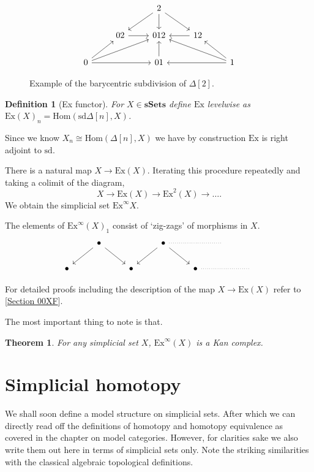 \documentclass[12pt]{report}
\numberwithin{equation}{section}
\newcommand{\Hom}{{\mathrm{Hom}}}
\newtheorem{theorem}[dummy]{Theorem}
\newtheorem{definition}[dummy]{Definition}
\begin{document}
	\begin{figure}[!htb]
		\centering
		\[\begin{tikzcd}
			&& 2 \\
			& 02 & 012 & 12 \\
			0 && 01 && 1
			\arrow[from=1-3, to=2-2]
			\arrow[from=1-3, to=2-3]
			\arrow[from=1-3, to=2-4]
			\arrow[from=2-2, to=2-3]
			\arrow[from=2-4, to=2-3]
			\arrow[from=3-1, to=2-2]
			\arrow[from=3-1, to=2-3]
			\arrow[from=3-1, to=3-3]
			\arrow[from=3-3, to=2-3]
			\arrow[from=3-5, to=2-3]
			\arrow[from=3-5, to=2-4]
			\arrow[from=3-5, to=3-3]
		\end{tikzcd}\]
		\caption{Example of the barycentric subdivision of \(\Delta[2]\).}
		\label{fig:bary}
	\end{figure}
	\begin{definition}[Ex functor]
		For \( X \in \mathbf{sSets} \) define \( \mathrm{Ex} \) levelwise as \( \mathrm{Ex}(X)_n = \Hom(\mathrm{sd}\Delta[n],X) \).
	\end{definition}
	
	Since we know \( X_n \cong \Hom(\Delta[n],X) \) we have by construction \( \mathrm{Ex} \) is right adjoint to \( \mathrm{sd} \).
	
	There is a natural map \( X \to \mathrm{Ex}(X) \). Iterating this procedure repeatedly and taking a colimit of the diagram,\[ X \to \mathrm{Ex}(X) \to \mathrm{Ex}^2(X) \to \dots. \]
	We obtain the simplicial set \( \mathrm{Ex}^\infty X \).
	
	The elements of \( \mathrm{Ex}^\infty(X)_1 \) consist of `zig-zags' of morphisms in \( X \).
	\[\begin{tikzcd}
		& \bullet && \bullet && {} \\
		\bullet && \bullet && \bullet && {}
		\arrow[from=1-2, to=2-1]
		\arrow[from=1-2, to=2-3]
		\arrow[dotted, no head, from=1-4, to=1-6]
		\arrow[from=1-4, to=2-3]
		\arrow[from=1-4, to=2-5]
		\arrow[dotted, no head, from=2-5, to=2-7]
	\end{tikzcd}\]
	
	For detailed proofs including the description of the map \( X \to \mathrm{Ex}(X) \) refer to \cite{kerodon}[\href{https://kerodon.net/tag/00XF}{Section 00XF}].
	
	The most important thing to note is that.
	\begin{theorem}
		For any simplicial set \( X \), \( \mathrm{Ex}^\infty(X) \) is a Kan complex.
	\end{theorem}
	\section{Simplicial homotopy}
	We shall soon define a model structure on simplicial sets. After which we can directly read off the definitions of homotopy and homotopy equivalence as covered in the chapter on model categories. However, for clarities sake we also write them out here in terms of simplicial sets only. Note the striking similarities with the classical algebraic topological definitions.
	
\end{document}
